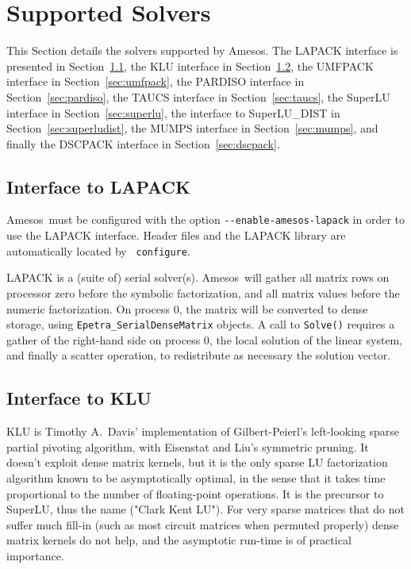 \documentclass[11pt]{SANDreport}
\newcommand{\amesos}{{\sc Amesos}}
\begin{document}
\section{Supported Solvers}
\label{sec:classes}

This Section details the solvers supported by \amesos.
The LAPACK interface is presented in Section~\ref{sec:lapack}, the KLU
interface in Section~\ref{sec:klu}, the UMFPACK interface
in Section~\ref{sec:umfpack},
  the PARDISO interface in Section~\ref{sec:pardiso},
  the TAUCS interface in Section~\ref{sec:taucs},
  the SuperLU interface in Section~\ref{sec:superlu}, the interface to
  SuperLU\_DIST in Section~\ref{sec:superludist}, the MUMPS interface in
  Section~\ref{sec:mumps}, and finally the DSCPACK interface in
  Section~\ref{sec:dscpack}. 

\subsection{Interface to LAPACK}
\label{sec:lapack}

\amesos\ must be configured with the option
\verb!--enable-amesos-lapack! in order to use the LAPACK interface.
Header files and the LAPACK library are automatically located by {\tt
  configure}.

LAPACK is a (suite of) serial solver(s). \amesos\ will gather all matrix rows
on processor zero before the symbolic factorization, and all matrix values
before the numeric factorization. On process 0, the matrix will be converted
to dense storage, using \verb!Epetra_SerialDenseMatrix! objects.  A call to
\verb!Solve()! requires a gather of the right-hand side on process 0, the
local solution of the linear system, and finally a scatter operation, to
redistribute as necessary the solution vector.

\subsection{Interface to KLU}
\label{sec:klu}

KLU is Timothy A.~Davis' implementation of Gilbert-Peierl's left-looking sparse
partial pivoting algorithm, with Eisenstat and Liu's symmetric pruning.
It doesn't exploit dense matrix kernels, but it is the only sparse LU
factorization algorithm known to be asymptotically optimal, in the sense
that it takes time proportional to the number of floating-point
operations. It is the precursor to SuperLU, thus the name ("Clark Kent
LU"). For very sparse matrices that do not suffer much fill-in (such as
most circuit matrices when permuted properly) dense matrix kernels do
not help, and the asymptotic run-time is of practical importance.
\end{document}
